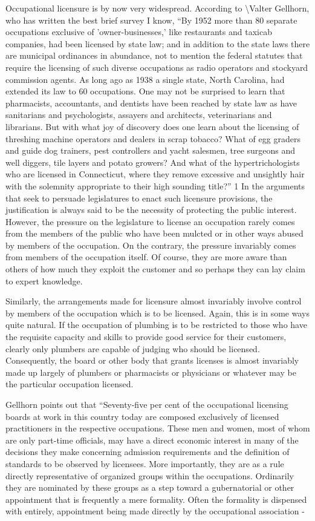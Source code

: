 \documentclass[11pt,openany]{book}
\begin{document}
Occupational licensure is by now very widespread. According to \textbackslash{}Valter Gellhorn, who has written the best brief survey I know, ``By 1952 more than 80 separate occupations exclusive of 'owner-businesses,' like restaurants and taxicab companies, had been licensed by state law; and in addition to the state laws there are municipal ordinances in abundance, not to mention the federal statutes that require the licensing of such diverse occupations as radio operators and stockyard commission agents. As long ago as 1938 a single state, North Carolina, had extended its law to 60 occupations. One may not be surprised to learn that pharmacists, accountants, and dentists have been reached by state law as have sanitarians and psychologists, assayers and architects, veterinarians and librarians. But with what joy of discovery does one learn about the licensing of threshing machine operators and dealers in scrap tobacco? What of egg graders and guide dog trainers, pest controllers and yacht salesmen, tree surgeons and well diggers, tile layers and potato growers? And what of the hypertrichologists who are licensed in Connecticut, where they remove excessive and unsightly hair with the solemnity appropriate to their high sounding title?'' 1 In the arguments that seek to persuade legislatures to enact such licensure provisions, the justification is always said to be the necessity of protecting the public interest. However, the pressure on the legislature to license an occupation rarely comes from the members of the public who have been mulcted or in other ways abused by members of the occupation. On the contrary, the pressure invariably comes from members of the occupation itself. Of course, they are more aware than others of how much they exploit the customer and so perhaps they can lay claim to expert knowledge.

Similarly, the arrangements made for licensure almost invariably involve control by members of the occupation which is to be licensed. Again, this is in some ways quite natural. If the occupation of plumbing is to be restricted to those who have the requisite capacity and skills to provide good service for their customers, clearly only plumbers are capable of judging who should be licensed. Consequently, the board or other body that grants licenses is almost invariably made up largely of plumbers or pharmacists or physicians or whatever may be the particular occupation licensed.

Gellhorn points out that ``Seventy-five per cent of the occupational licensing boards at work in this country today are composed exclusively of licensed practitioners in the respective occupations. These men and women, most of whom are only part-time officials, may have a direct economic interest in many of the decisions they make concerning admission requirements and the definition of standards to be observed by licensees. More importantly, they are as a rule directly representative of organized groups within the occupations. Ordinarily they are nominated by these groups as a step toward a gubernatorial or other appointment that is frequently a mere formality. Often the formality is dispensed with entirely, appointment being made directly by the occupational association -
\end{document}
